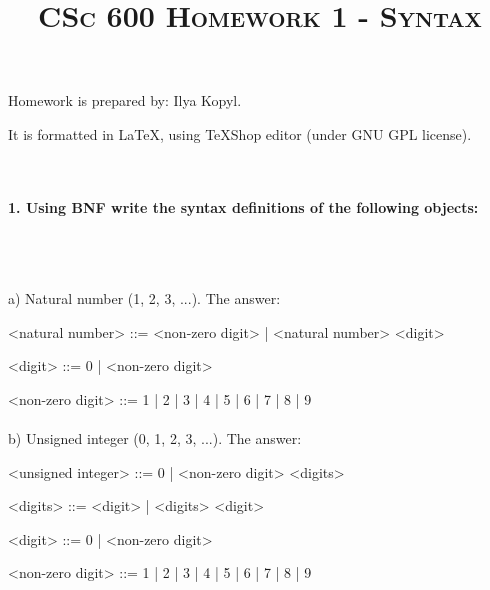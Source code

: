 \documentclass{article}
\begin{document}
	\setlength{\grammarparsep}{5pt plus 1pt minus 1pt} %
	\setlength{\grammarindent}{5cm} 

	\title{\textsc{CSc 600 Homework 1 - Syntax}}

	\maketitle

		Homework is prepared by: Ilya Kopyl.

		It is formatted in LaTeX, using TeXShop editor (under GNU GPL license).

	\rmfamily\




	\paragraph{1. Using BNF write the syntax definitions of the following objects:}\
	\rmfamily\\\
	
		a) Natural number (1, 2, 3, ...). The answer:
			
	\ttfamily
	\begin{grammar}
	
		<natural number> ::= <non-zero digit> | <natural number> <digit>

		<digit> ::= 0 | <non-zero digit>

		<non-zero digit> ::= 1 | 2 | 3 | 4 | 5 | 6 | 7 | 8 | 9
		
	\end{grammar}
	
	

	
	\paragraph{}
	\rmfamily
	
		b) Unsigned integer (0, 1, 2, 3, ...). The answer:
			
	\ttfamily
	\begin{grammar}
		
		<unsigned integer> ::= 0 | <non-zero digit> <digits>
		
		<digits> ::= <digit> | <digits> <digit>

		<digit> ::= 0 | <non-zero digit>

		<non-zero digit> ::= 1 | 2 | 3 | 4 | 5 | 6 | 7 | 8 | 9
		
	\end{grammar}
\end{document}
